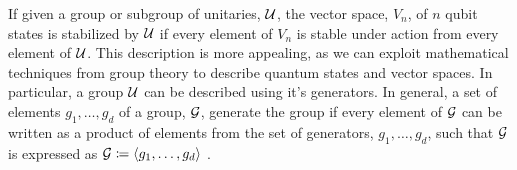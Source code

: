 If given a group or subgroup of unitaries, $\cal U$, the vector space, $V_n$, of $n$ qubit states is
stabilized by $\cal U$ if every element of $V_n$ is stable under action from every element of $\cal U$.
This description is more appealing, as we can exploit mathematical techniques from group theory to
describe quantum states and vector spaces. In particular, a group $\cal U$ can be described using it's
generators. In general, a set of elements  $g_1, \dots, g_d$ of a group, $\cal G$, generate the group
if every element of $\cal G$ can be written as a product of elements from the set of generators,
$g_1, \dots, g_d$, such that ${\cal G}$ is expressed as ${\cal G} \coloneqq \langle g_1, \dots, g_d\rangle$ \cite{Calderbank_1997}.

